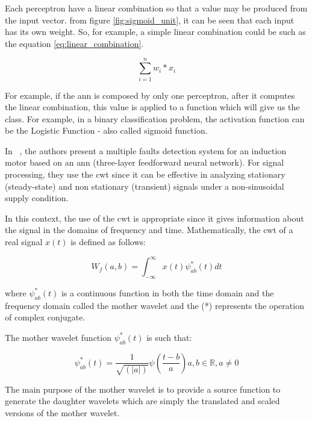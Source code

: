 Each perceptron have a linear combination so that a value may be produced from the input vector. from figure \ref{fig:sigmoid_unit}, it can be seen that each input has its own weight. So, for example, a simple linear combination could be such as the equation \ref{eq:linear_combination}.

\begin{equation} 
\label{eq:linear_combination}
\sum_{i=1}^{n} w_{i}*x_{i}
\end{equation}

For example, if the \Acrshort{ann} is composed by only one perceptron, after it computes the linear combination, this value is applied to a function which will give us the class. For example, in a binary classification problem, the activation function can be the Logistic Function - also called sigmoid function.

In ~\cite{Jawadekar2014}, the authors present a multiple faults detection system for an induction motor based on an \Acrshort{ann} (three-layer feedforward neural network). For signal processing, they use the \acrfull{cwt} since it can be effective in analyzing stationary (steady-state) and non stationary (transient) signals under a non-sinusoidal supply condition.

In this context, the use of the \acrshort{cwt} is appropriate since it gives information about the signal in the domains of frequency and time.
Mathematically, the \acrshort{cwt} of a real signal $x(t)$ is defined as follows:

\begin{equation} 
\label{eq:wavelet_transform}
    W_f(a,b) = \int_{- \infty}^{\infty}  x(t) \psi_{ab}^*(t) dt
\end{equation}


\noindent where $ \psi_{ab}^*(t)$  is a continuous function in both the time domain and the frequency domain called the mother wavelet and the (*) represents the operation of complex conjugate.

The mother wavelet function $ \psi_{ab}^*(t)$ is such that:

\begin{equation} 
\label{eq:mother_wavelet}
   \psi_{ab}^*(t) = \frac{1}{\sqrt{(\lvert a\rvert)}} \psi \left( \frac{t - b}{a} \right)  a,b \in \mathbb{R}, a \neq 0 
\end{equation}

The main purpose of the mother wavelet is to provide a source function to generate the daughter wavelets which are simply the translated and scaled versions of the mother wavelet.

